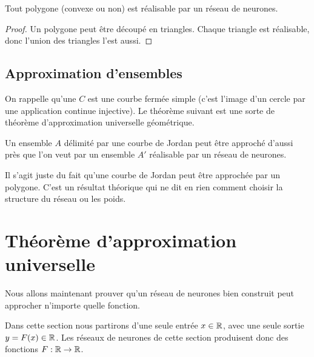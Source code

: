 \begin{proposition}{}{}
	Tout polygone (convexe ou non) est réalisable par un réseau de neurones.
\end{proposition}

\begin{proof}
	Un polygone peut être découpé en triangles. Chaque triangle est réalisable, donc l'union des triangles l'est aussi.
	
	
	
\end{proof}

\subsection{Approximation d'ensembles}



On rappelle qu'une   $C$ est une courbe fermée simple (c'est l'image d'un cercle par une application continue injective). Le théorème suivant est une sorte de théorème d'approximation universelle géométrique.

\begin{theoreme}{}{}
	Un ensemble $A$ délimité par une courbe de Jordan peut être approché d'aussi près que l'on veut par un ensemble $A'$ réalisable par un réseau de neurones.
\end{theoreme}

Il s'agit juste du fait qu'une courbe de Jordan peut être approchée par un polygone.
C'est un résultat théorique qui ne dit en rien comment choisir la structure du réseau ou les poids.





\section{Théorème d'approximation universelle}

Nous allons maintenant prouver qu'un réseau de neurones bien construit peut approcher n'importe quelle fonction. 

Dans cette section nous partirons d'une seule entrée $x \in \mathbb{R}$, avec une seule sortie $y = F(x) \in \mathbb{R}$. Les réseaux de neurones de cette section produisent donc des fonctions $F : \mathbb{R} \to \mathbb{R}$.

